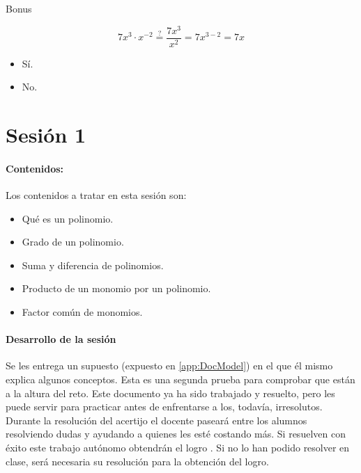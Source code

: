 \newbloq Bonus

\[
	7x^3·x^{-2} \overset{?}{=} \frac{7x^3}{x^2} = 7x^{3-2} = 7x
\]

\begin{itemize}
	\item {} Sí.
	\item No.
\end{itemize}




\section{Sesión 1}


\paragraph{Contenidos:}
Los contenidos a tratar en esta sesión son:
\begin{itemize}
\item Qué es un polinomio.
\item Grado de un polinomio.
\item Suma y diferencia de polinomios.
\item Producto de un monomio por un polinomio.
\item Factor común de monomios.
\end{itemize}


\paragraph{Desarrollo de la sesión} 

Se les entrega un supuesto  (expuesto en \ref{app:DocModel}) en el que él mismo explica algunos conceptos.
%
Esta es una segunda prueba para comprobar que están a la altura del reto.
%
Este documento ya ha sido trabajado y resuelto, pero les puede servir para practicar antes de enfrentarse a los, todavía, irresolutos.
%
Durante la resolución del acertijo el docente paseará entre los alumnos resolviendo dudas y ayudando a quienes les esté costando más. 
%
Si resuelven con éxito este trabajo autónomo obtendrán el logro .
%
Si no lo han podido resolver en clase, será necesaria su resolución para la obtención del logro.

